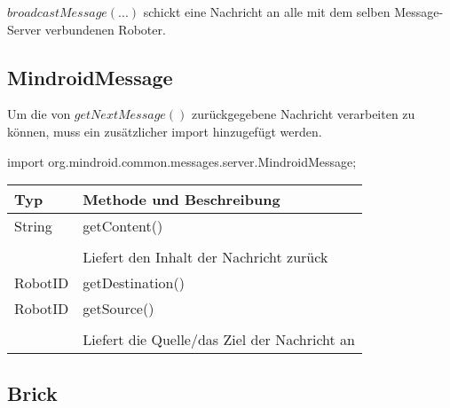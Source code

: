 		$broadcastMessage(...)$ schickt eine Nachricht an alle mit dem selben Message-Server verbundenen Roboter.
		
		\subsection{MindroidMessage}

			Um die von $getNextMessage()$ zurückgegebene Nachricht verarbeiten zu können, muss ein zusätzlicher import hinzugefügt werden.
						\begin{center}import org.mindroid.common.messages.server.MindroidMessage;\end{center}
		
			\begin{table}[htbp]
				\begin{tabular}{|p{} p{}|}
					\hline
					\textbf{Typ} & \textbf{Methode und Beschreibung} \\ \hline
					String & getContent() \\ 
							&\\
					& Liefert den Inhalt der Nachricht zurück\\ \hline
					RobotID & getDestination() \\ 
					RobotID & getSource() \\ 
							&\\
					& Liefert die Quelle/das Ziel der Nachricht an\\ \hline		
				\end{tabular}
			\end{table}
		
	\subsection{Brick}

